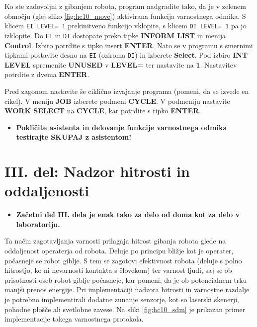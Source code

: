 Ko ste zadovoljni z gibanjem robota, program nadgradite tako, da je v zelenem območju (glej sliko \ref{fig:hc10_move}) aktivirana funkcija varnostnega odmika. S klicem \verb"EI LEVEL= 1" prekinitveno funkcijo vklopite, s klicem \verb"DI LEVEL= 1" pa jo izklopite. Do \verb"EI" in \verb"DI" dostopate preko tipke \textbf{INFORM LIST} in menija \textbf{Control}. Izbiro potrdite s tipko insert \textbf{ENTER}. Nato se v programu s smernimi tipkami postavite desno na \verb"EI" (oziroma \verb"DI") in izberete \textbf{Select}. Pod izbiro \textbf{INT LEVEL} spremenite \textbf{UNUSED} v \textbf{LEVEL=} ter nastavite na \textbf{1}. Nastavitev potrdite z dvema \textbf{ENTER}.

Pred zagonom nastavite še ciklično izvajanje programa (pomeni, da se izvede en cikel). V meniju \textbf{JOB} izberete podmeni \textbf{CYCLE}. V podmeniju nastavite \textbf{WORK SELECT} na \textbf{CYCLE}, kar potrdite s tipko \textbf{ENTER}.

\vspace{5mm}

\begin{mdframed}[backgroundcolor=red!20, shadow=true,roundcorner=8pt]
	\begin{itemize}
		\item \textbf{Pokličite asistenta in delovanje funkcije varnostnega odmika testirajte SKUPAJ z asistentom!}		
	\end{itemize}
\end{mdframed}


\section{III. del: Nadzor hitrosti in oddaljenosti}

\begin{mdframed}[backgroundcolor=red!20, shadow=true,roundcorner=8pt]
	\begin{itemize}
		\item \textbf{Začetni del III. dela je enak tako za delo od doma kot za delo v laboratoriju.}		
	\end{itemize}
\end{mdframed}

Ta način zagotavljanja varnosti prilagaja hitrost gibanja robota glede na oddaljenost operaterja od robota. Deluje po principu bližje kot je operater, počasneje se robot giblje. S tem se zagotovi efektivnost robota (deluje s polno hitrostjo, ko ni nevarnosti kontakta s človekom) ter varnost ljudi, saj se ob prisotnosti oseb robot giblje počasneje, kar pomeni, da je ob potencialnem trku manjši prenos energije. Pri implementaciji nadzora hitrosti in varnostne razdalje je potrebno implementirali dodatne zunanje senzorje, kot so laserski skenerji, pohodne plošče ali svetlobne zavese. Na sliki \ref{fig:hc10_sdm} je prikazan primer implementacije takega varnostnega protokola.

